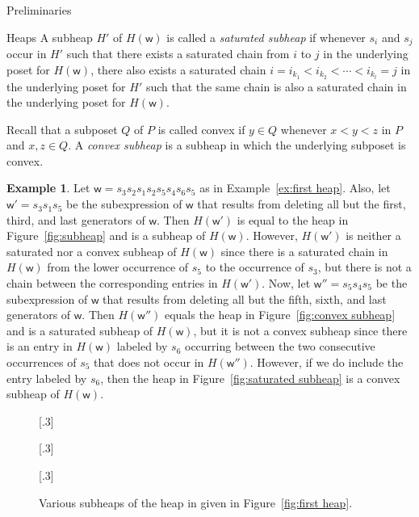 \documentclass[11pt]{amsart}
\theoremstyle{definition}
\newtheorem{example}[theorem]{Example}
\numberwithin{equation}{section}
\renewcommand{\(}{\left(}
\renewcommand{\)}{\right)}
\newcommand{\w}{\mathsf{w}}
\newcommand\xxaxis{0}
\newcommand\yyaxis{90}
\newcommand\heapblock[3]{\fill[draw=black, fill=gray!30, rounded corners, line width=1.1pt, shift={(\xxaxis:#1)},shift={(\yyaxis:#2)}] (-1,-0.5) rectangle (1,0.5);\node at (#1,#2) {$#3$};}
\begin{document}
\begin{section}{Preliminaries}
\begin{subsection}{Heaps}
A subheap $H'$ of $H(\w)$ is called a \emph{saturated subheap} if whenever $s_{i}$ and $s_{j}$ occur in $H'$ such that there exists a saturated chain from $i$ to $j$ in the underlying poset for $H(\w)$, there also exists a saturated chain $i=i_{k_{1}}<i_{k_{2}}< \cdots < i_{k_{l}}=j$ in the underlying poset for $H'$ such that the same chain is also a saturated chain in the underlying poset for $H(\w)$.

Recall that a subposet $Q$ of $P$ is called convex if $y \in Q$ whenever $x < y < z$ in $P$ and $x, z \in Q$.  A \emph{convex subheap} is a subheap in which the underlying subposet is convex.

\begin{example}\label{ex:third heap}
Let $\w= s_3 s_2 s_1 s_2 s_5s_{4}s_{6}s_{5}$ as in Example~\ref{ex:first heap}.  Also, let $\w'=s_3 s_1 s_{5}$ be the subexpression of $\w$ that results from deleting all but the first, third, and last generators of $\w$.  Then $H(\w')$ is equal to the heap in Figure~\ref{fig:subheap} and is a subheap of $H(\w)$.  However, $H(\w')$ is neither a saturated nor a convex subheap of $H(\w)$ since there is a saturated chain in $H(\w)$ from the lower occurrence of $s_{5}$ to the occurrence of $s_{3}$, but there is not a chain between the corresponding entries in $H(\w')$.  Now, let $\w''=s_{5}s_{4}s_{5}$ be the subexpression of $\w$ that results from deleting all but the fifth, sixth, and last generators of $\w$.  Then $H(\w'')$ equals the heap in Figure~\ref{fig:convex subheap} and is a saturated subheap of $H(\w)$, but it is not a convex subheap since there is an entry in $H(\w)$ labeled by $s_{6}$ occurring between the two consecutive occurrences of $s_{5}$ that does not occur in $H(\w'')$.  However, if we do include the entry labeled by $s_{6}$, then the heap in Figure~\ref{fig:saturated subheap}  is a convex subheap of $H(\w)$.  
\end{example}

\begin{figure}[!ht]
\subcaptionbox{\label{fig:subheap}}[.3\textwidth]{
}
\subcaptionbox{\label{fig:convex subheap}}[.3\textwidth]{
}
\subcaptionbox{\label{fig:saturated subheap}}[.3\textwidth]{
}
\caption{Various subheaps of the heap in given in Figure~\ref{fig:first heap}.}
\label{fig:subheaps}
\end{figure}


\end{subsection}
\end{section}
\end{document}
